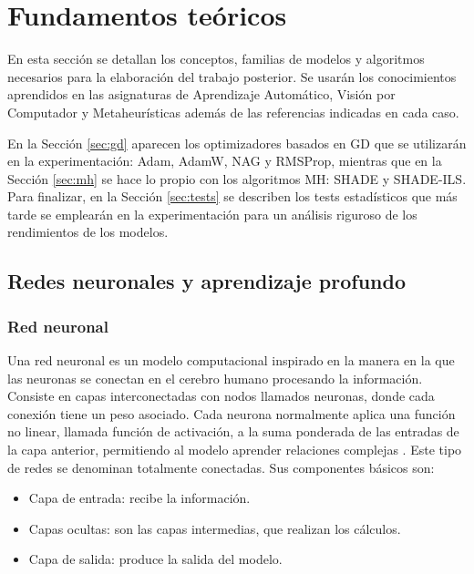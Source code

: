 \section{Fundamentos teóricos}
En esta sección se detallan los conceptos, familias de modelos y algoritmos necesarios para la elaboración del trabajo posterior. Se usarán los conocimientos aprendidos en las asignaturas de Aprendizaje Automático, Visión por Computador y Metaheurísticas además de las referencias indicadas en cada caso.


En la Sección \ref{sec:gd} aparecen los optimizadores basados en GD que se utilizarán en la experimentación: Adam, AdamW, NAG y RMSProp, mientras que en la Sección \ref{sec:mh} se hace lo propio con los algoritmos MH: SHADE y SHADE-ILS. Para finalizar, en la Sección \ref{sec:tests} se describen los tests estadísticos que más tarde se emplearán en la experimentación para un análisis riguroso de los rendimientos de los modelos.

\subsection{Redes neuronales y aprendizaje profundo}
\label{sec:profundo}

\subsubsection{Red neuronal}

Una red neuronal es un modelo computacional inspirado en la manera en la que las neuronas se conectan en el cerebro humano procesando la información. Consiste en capas interconectadas con nodos llamados neuronas, donde cada conexión tiene un peso asociado. Cada neurona normalmente aplica una función no linear, llamada función de activación, a la suma ponderada de las entradas de la capa anterior, permitiendo al modelo aprender relaciones complejas \cite{stanford_231}. Este tipo de redes se denominan totalmente conectadas. Sus componentes básicos son:

\begin{itemize}
	\item Capa de entrada: recibe la información.
	
	\item Capas ocultas: son las capas intermedias, que realizan los cálculos.
	
	\item Capa de salida: produce la salida del modelo.
\end{itemize}

